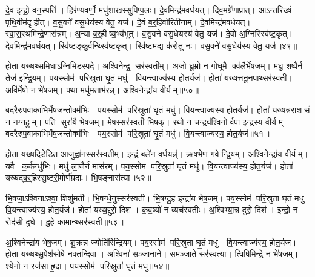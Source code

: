 दे॒व इन्द्रो॒ वन॒स्पति॑। हिर॑ण्यवर्णो॒ मधु॑शाखस्सुपिप्प॒लः। दे॒वमिन्द्र॑मवर्धयत्। दिव॒मग्रे॑णाप्रात्। आऽन्तरि॑ख्षं पृथि॒वीम॑दृहीत्। व॒सु॒वने॑ वसु॒धेय॑स्य वेतु॒ यज॑। दे॒वं ब॒र्॒हिर्वारि॑तीनाम्। दे॒वमिन्द्र॑मवर्धयत्। स्वा॒स॒स्थमिन्द्रे॒णास॑न्नम्। अ॒न्या ब॒र्॒हीष्य॒भ्य॑भूत्। व॒सु॒वने॑ वसु॒धेयस्य॑ वेतु॒ यज॑। दे॒वो अ॒ग्निस्स्वि॑ष्ट॒कृत्। दे॒वमिन्द्र॑मवर्धयत्। स्वि॑ष्टङ्कु॒र्वन्थ्स्वि॑ष्ट॒कृत्। स्वि॑ष्टम॒द्य क॑रोतु नः। व॒सु॒वने॑ वसु॒धेय॑स्य वेतु॒ यज॑॥४९॥

होता॑ यख्षथ्स॒मिधा॒ऽग्निमि॒डस्प॒दे। अ॒श्विनेन्द्र॒ सर॑स्वतीम्। अ॒जो धू॒म्रो न गो॒धूमै॒ क्व॑लैर्भेष॒जम्। मधु॒ शष्पै॒र्न तेज॑ इन्द्रि॒यम्। पय॒स्सोम॑ परि॒स्रुता॑ घृ॒तं मधु॑। वि॒यन्त्वाज्य॑स्य॒ होत॒र्यज॑। होता॑ यख्ष॒त्तनू॒नपा॒थ्सर॑स्वती। अवि॑र्मे॒षो न भे॑ष॒जम्। प॒था मधु॑म॒ताभ॑रन्न्। अ॒श्विनेन्द्रा॑य वी॒र्यम्॥५०॥

बद॑रैरुप॒वाका॑भिर्भेष॒जन्तोक्म॑भिः। पय॒स्सोम॑ परि॒स्रुता॑ घृ॒तं मधु॑। वि॒यन्त्वाज्य॑स्य॒ होत॒र्यज॑। होता॑ यख्ष॒न्नरा॒शसं॒ न न॒ग्नहुम्। पति॒ सुरा॑यै भेष॒जम्। मे॒षस्सर॑स्वती भि॒षक्। रथो॒ न च॒न्द्र्य॑श्विनोर्व॒पा इन्द्र॑स्य वी॒र्यम्। बद॑रैरुप॒वाका॑भिर्भेष॒जन्तोक्म॑भिः। पय॒स्सोम॑ परि॒स्रुता॑ घृ॒तं मधु॑। वि॒यन्त्वाज्य॑स्य॒ होत॒र्यज॑॥५१॥

होता॑ यख्षदि॒डेडि॒त आ॒जुह्वा॑न॒स्सर॑स्वतीम्। इन्द्रं॒ बले॑न व॒र्धयन्न्॑। ऋ॒ष॒भेण॒ गवेन्द्रि॒यम्। अ॒श्विनेन्द्रा॑य वी॒र्यम्। यवै क॒र्कन्धु॑भिः। मधु॑ ला॒जैर्न मास॑रम्। पय॒स्सोम॑ परि॒स्रुता॑ घृ॒तं मधु॑। वि॒यन्त्वाज्य॑स्य॒ होत॒र्यज॑। होता॑ यख्षद्ब॒र्॒हिस्सु॒ष्टरी॒मोर्ण॑म्रदाः। भि॒षङ्नास॑त्या॥५२॥

भि॒षजा॒ऽश्विनाऽश्वा॒ शिशु॑मती। भि॒षग्धे॒नुस्सर॑स्वती। भि॒षग्दु॒ह इन्द्रा॑य भेष॒जम्। पय॒स्सोम॑ परि॒स्रुता॑ घृ॒तं मधु॑। वि॒यन्त्वाज्य॑स्य॒ होत॒र्यज॑। होता॑ यख्ष॒द्दुरो॒ दिश॑। क॒व॒ष्यो॑ न व्यच॑स्वतीः। अ॒श्विभ्या॒न्न दुरो॒ दिश॑। इन्द्रो॒ न रोद॑सी॒ दुघे। दु॒हे कामा॒न्थ्सर॑स्वती॥५३॥

अ॒श्विनेन्द्रा॑य भेष॒जम्। शु॒क्रन्न ज्योति॑रिन्द्रि॒यम्। पय॒स्सोम॑ परि॒स्रुता॑ घृ॒तं मधु॑। वि॒यन्त्वाज्य॑स्य॒ होत॒र्यज॑। होता॑ यख्षथ्सु॒पेश॑सो॒षे नक्त॒न्दिवा। अ॒श्विना॑ सञ्जाना॒ने। सम॑ञ्जाते॒ सर॑स्वत्या। त्विषि॒मिन्द्रे॒ न भे॑ष॒जम्। श्ये॒नो न रज॑सा हृ॒दा। पय॒स्सोम॑ परि॒स्रुता॑ घृ॒तं मधु॑॥५४॥

